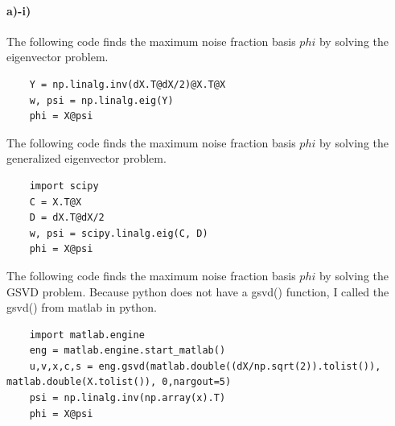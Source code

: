 \documentclass{article}
\begin{document}
\paragraph{a)-i)} The following code finds the maximum noise fraction basis $phi$ by solving the eigenvector problem. 
\begin{lstlisting}
	Y = np.linalg.inv(dX.T@dX/2)@X.T@X
	w, psi = np.linalg.eig(Y)
	phi = X@psi
\end{lstlisting}
The following code finds the maximum noise fraction basis $phi$ by solving the generalized eigenvector problem. 
\begin{lstlisting}
	import scipy
	C = X.T@X
	D = dX.T@dX/2
	w, psi = scipy.linalg.eig(C, D)
	phi = X@psi
\end{lstlisting}
The following code finds the maximum noise fraction basis $phi$ by solving the GSVD problem. Because python does not have a gsvd() function, I called the gsvd() from matlab in python.
\begin{lstlisting}
	import matlab.engine
	eng = matlab.engine.start_matlab()
	u,v,x,c,s = eng.gsvd(matlab.double((dX/np.sqrt(2)).tolist()), matlab.double(X.tolist()), 0,nargout=5)
	psi = np.linalg.inv(np.array(x).T)
	phi = X@psi
\end{lstlisting}
\end{document}
